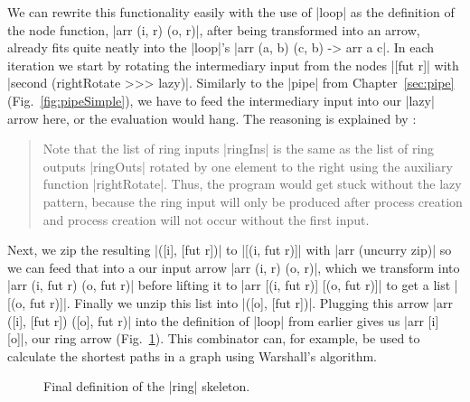We can rewrite this functionality easily with the use of |loop| as the definition of the node function, |arr (i, r) (o, r)|, after being transformed into an arrow, already fits quite neatly into the |loop|'s |arr (a, b) (c, b) -> arr a c|. In each iteration we start by rotating the intermediary input from the nodes |[fut r]| with |second (rightRotate >>> lazy)|. Similarly to the |pipe| from Chapter~\ref{sec:pipe} (Fig.~\ref{fig:pipeSimple}), we have to feed the intermediary input into our |lazy| arrow here, or the evaluation would hang. The reasoning is explained by \citet{Loogen2012}:
\begin{quote}
{Note that the list of ring inputs |ringIns| is the same as the list of ring outputs |ringOuts| rotated by one element to the right using the auxiliary function |rightRotate|. Thus, the program would get stuck without the lazy pattern, because the ring input will only be produced after process creation and process creation will not occur without the first input.}
\end{quote}
Next, we zip the resulting |([i], [fut r])| to |[(i, fut r)]| with |arr (uncurry zip)| so we can feed that into a our input arrow |arr (i, r) (o, r)|, which we transform into |arr (i, fut r) (o, fut r)| before lifting it to |arr [(i, fut r)] [(o, fut r)]| to get a list |[(o, fut r)]|. Finally we unzip this list into |([o], [fut r])|. Plugging this arrow |arr ([i], [fut r]) ([o], fut r)| into the definition of |loop| from earlier gives us |arr [i] [o]|, our ring arrow (Fig.~\ref{fig:ringFinal}).
This combinator can, for example, be used to calculate the shortest paths in a graph using Warshall's algorithm.


\begin{figure}[h]
\caption{Final definition of the |ring| skeleton.}
\label{fig:ringFinal}
\end{figure}

